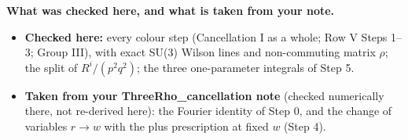 \documentclass[9pt]{article}
\numberwithin{equation}{section}
\begin{document}
\noindent\textbf{What was checked here, and what is taken from your note.}
\begin{itemize}
\item \textbf{Checked here:} every colour step (Cancellation I as a whole; Row V Steps 1--3; Group III), with exact SU(3) Wilson lines and non-commuting matrix $\rho$; the split of $R^{i}/(p^{2}q^{2})$; the three one-parameter integrals of Step 5.
\item \textbf{Taken from your ThreeRho\_cancellation note} (checked numerically there, not re-derived here): the Fourier identity of Step 0, and the change of variables $r\to w$ with the plus prescription at fixed $w$ (Step 4).
\end{itemize}
\end{document}
